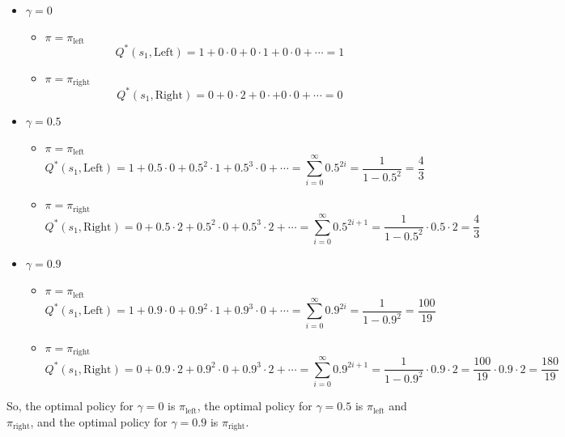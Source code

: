 \begin{itemize}
    \item $\gamma = 0$
    \begin{itemize}
      \item $\pi = \pi_{\text{left}}$
      \[Q^*(s_1, \text{Left}) = 1 + 0 \cdot 0 + 0 \cdot 1 + 0 \cdot 0 + \cdots = 1\]
      \item $\pi = \pi_{\text{right}}$
      \[Q^*(s_1, \text{Right}) = 0 + 0 \cdot 2 + 0 \cdot  + 0 \cdot 0 + \cdots = 0\]
    \end{itemize}
    \item $\gamma = 0.5$
    \begin{itemize}
      \item $\pi = \pi_{\text{left}}$
      \[Q^*(s_1, \text{Left}) = 1 + 0.5 \cdot 0 + 0.5^2 \cdot 1 + 0.5^3 \cdot 0 + \cdots = \sum_{i=0}^{\infty} 0.5^{2i} = \frac{1}{1 - 0.5^2} = \frac{4}{3}\]
      \item $\pi = \pi_{\text{right}}$
      \[Q^*(s_1, \text{Right}) = 0 + 0.5 \cdot 2 + 0.5^2 \cdot 0 + 0.5^3 \cdot 2 + \cdots = \sum_{i=0}^{\infty} 0.5^{2i + 1} = \frac{1}{1 - 0.5^2} \cdot 0.5 \cdot 2= \frac{4}{3}\]
    \end{itemize}
    \item $\gamma = 0.9$
    \begin{itemize}
      \item $\pi = \pi_{\text{left}}$
      \[Q^*(s_1, \text{Left}) = 1 + 0.9 \cdot 0 + 0.9^2 \cdot 1 + 0.9^3 \cdot 0 + \cdots = \sum_{i=0}^{\infty} 0.9^{2i} = \frac{1}{1 - 0.9^2} = \frac{100}{19}\]
      \item $\pi = \pi_{\text{right}}$
      \[Q^*(s_1, \text{Right}) = 0 + 0.9 \cdot 2 + 0.9^2 \cdot 0 + 0.9^3 \cdot 2 + \cdots = \sum_{i=0}^{\infty} 0.9^{2i + 1} = \frac{1}{1 - 0.9^2} \cdot 0.9 \cdot 2= \frac{100}{19} \cdot 0.9 \cdot 2 = \frac{180}{19}\]
      \end{itemize}
\end{itemize}

So, the optimal policy for $\gamma = 0$ is $\pi_{\text{left}}$, the optimal policy for $\gamma = 0.5$ is $\pi_{\text{left}}$ and $\pi_{\text{right}}$, and the optimal policy for $\gamma = 0.9$ is $\pi_{\text{right}}$.

